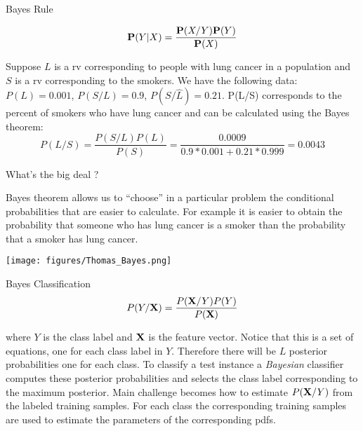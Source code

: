 \documentclass[12pt]{beamer}
\begin{document}




\begin{frame}{Bayes Rule} 
\begin{definition} 
\[
{\bf P}(Y|X) = \frac{{\bf P}(X/Y) {\bf P}(Y)}{{\bf P}(X)} 
\]
\end{definition}
\begin{example}
Suppose $L$ is a rv corresponding to people with lung cancer in a population 
and $S$ is a rv corresponding to the smokers. We have the following data: 
$P(L) = 0.001$, $P(S/L) = 0.9$, $P(S/\hat L)=0.21$. P(L/S) corresponds to the percent of smokers who have lung cancer and can be calculated using the Bayes theorem: 
\[
P(L/S) = \frac{P(S/L)P(L)}{P(S)} = \frac{0.0009}{0.9 * 0.001 + 0.21 * 0.999} = 0.0043 
\]
\end{example}
\end{frame} 

\begin{frame}{What's the big deal ? }

Bayes theorem allows us to ``choose'' in a particular problem the
conditional probabilities that are easier to calculate. For example it
is easier to obtain the probability that someone who has lung cancer
is a smoker than the probability that a smoker has lung cancer.

\hspace{4cm} 
 \texttt{[image: figures/Thomas\_Bayes.png]}

\end{frame} 





\begin{frame}{Bayes Classification} 
\begin{equation} 
P(Y/{\bf X}) = \frac{P({\bf X}/Y) P(Y)}{P(\bf X)}
\end{equation}

where $Y$ is the class label and ${\bf X}$ is the feature
vector. Notice that this is a set of equations, one for each class
label in $Y$. Therefore there will be $L$ posterior probabilities one
for each class.  \pause To classify a test instance a {\it Bayesian}
classifier computes these posterior probabilities and selects the
class label corresponding to the maximum posterior. \pause Main
challenge becomes how to estimate $P({\bf X}/Y)$ from the labeled 
training samples. For each class the corresponding training samples
are used to estimate the parameters of the corresponding pdfs.

\end{frame}
\end{document}
